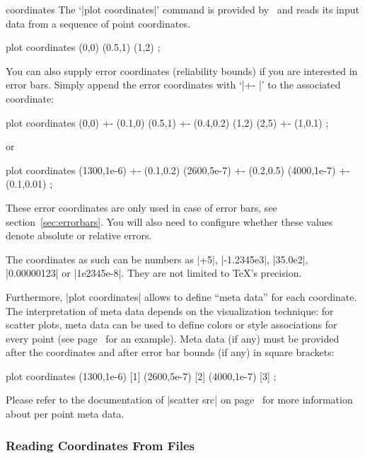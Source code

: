 \begin{addplotoperation}[]{coordinates}{}
The `|plot coordinates|' command is provided by \Tikz\ and reads its input data from a sequence of point coordinates.
\begin{codeexample}
\addplot plot coordinates {
	(0,0)
	(0.5,1)
	(1,2)
};
\end{codeexample}

You can also supply error coordinates (reliability bounds) if you are interested in error bars. Simply append the error coordinates with `|+- |' to the associated coordinate:
\begin{codeexample}
\addplot plot coordinates {
	(0,0)   +- (0.1,0)
	(0.5,1) +- (0.4,0.2)
	(1,2)
	(2,5)   +- (1,0.1)
};
\end{codeexample}
or 
\begin{codeexample}
\addplot plot coordinates {
	(1300,1e-6) +- (0.1,0.2)
	(2600,5e-7) +- (0.2,0.5)
	(4000,1e-7) +- (0.1,0.01)
};
\end{codeexample}
These error coordinates are only used in case of error bars, see section~\ref{sec:errorbars}. You will also need to configure whether these values denote absolute or relative errors.

The coordinates as such can be numbers as |+5|, |-1.2345e3|, |35.0e2|, |0.00000123| or |1e2345e-8|. They are not limited to \TeX's precision.

Furthermore, |plot coordinates| allows to define ``meta data'' for each coordinate. The interpretation of meta data depends on the visualization technique: for scatter plots, meta data can be used to define colors or style associations for every point (see page~\pageref{pgfplots:scatterclasses} for an example). Meta data (if any) must be provided after the coordinates and after error bar bounds (if any) in square brackets:
\begin{codeexample}
\addplot plot coordinates {
	(1300,1e-6) [1]
	(2600,5e-7) [2]
	(4000,1e-7) [3]
};
\end{codeexample}
Please refer to the documentation of |scatter src| on page~\pageref{pgfplots:scatter:src} for more information about per point meta data.
\end{addplotoperation}

\subsubsection{Reading Coordinates From Files}

